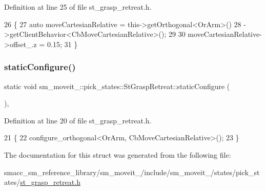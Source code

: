 Definition at line 25 of file st\+\_\+grasp\+\_\+retreat.\+h.


\begin{DoxyCode}
26     \{
27         \textcolor{keyword}{auto} moveCartesianRelative = this->getOrthogonal<OrArm>()
28                                          ->getClientBehavior<CbMoveCartesianRelative>();
29 
30         moveCartesianRelative->offset\_.z = 0.15;
31     \}
\end{DoxyCode}
\mbox{\label{structsm__moveit__4_1_1pick__states_1_1StGraspRetreat_a678250d9b3296956f285a2bc27af6641}} 
\subsubsection{\texorpdfstring{static\+Configure()}{staticConfigure()}}
{\footnotesize\ttfamily static void sm\+\_\+moveit\+\_\+::pick\+\_\+states\+::\+St\+Grasp\+Retreat\+::static\+Configure (\begin{DoxyParamCaption}{ }\end{DoxyParamCaption})\hspace{0.3cm}{\ttfamily [inline]}, {\ttfamily [static]}}



Definition at line 20 of file st\+\_\+grasp\+\_\+retreat.\+h.


\begin{DoxyCode}
21     \{
22         configure\_orthogonal<OrArm, CbMoveCartesianRelative>();
23     \}
\end{DoxyCode}


The documentation for this struct was generated from the following file\+:\begin{DoxyCompactItemize}
\item 
smacc\+\_\+sm\+\_\+reference\+\_\+library/sm\+\_\+moveit\+\_/include/sm\+\_\+moveit\+\_/states/pick\+\_\+states/\hyperlink{4_2include_2sm__moveit__4_2states_2pick__states_2st__grasp__retreat_8h}{st\+\_\+grasp\+\_\+retreat.\+h}\end{DoxyCompactItemize}
